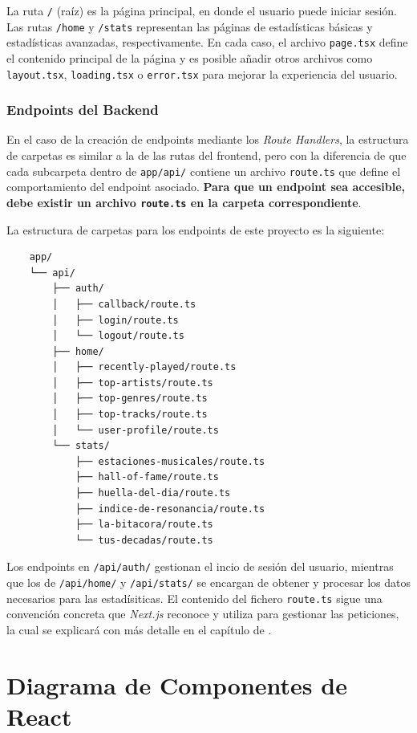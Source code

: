La ruta \texttt{/} (raíz) es la página principal, en donde el usuario puede iniciar sesión. Las rutas \texttt{/home} y \texttt{/stats} representan las páginas de estadísticas básicas y estadísticas avanzadas, respectivamente. En cada caso, el archivo \texttt{page.tsx} define el contenido principal de la página y es posible añadir otros archivos como \texttt{layout.tsx}, \texttt{loading.tsx} o \texttt{error.tsx} para mejorar la experiencia del usuario.

\subsubsection{Endpoints del Backend}

En el caso de la creación de endpoints mediante los \textit{Route Handlers}, la estructura de carpetas es similar a la de las rutas del frontend, pero con la diferencia de que cada subcarpeta dentro de \texttt{app/api/} contiene un archivo \texttt{route.ts} que define el comportamiento del endpoint asociado. \textbf{Para que un endpoint sea accesible, debe existir un archivo \texttt{route.ts} en la carpeta correspondiente}.

La estructura de carpetas para los endpoints de este proyecto es la siguiente:

\begin{verbatim}
    app/
    └── api/
        ├── auth/
        │   ├── callback/route.ts
        │   ├── login/route.ts
        │   └── logout/route.ts
        ├── home/
        │   ├── recently-played/route.ts
        │   ├── top-artists/route.ts
        │   ├── top-genres/route.ts
        │   ├── top-tracks/route.ts
        │   └── user-profile/route.ts
        └── stats/
            ├── estaciones-musicales/route.ts
            ├── hall-of-fame/route.ts
            ├── huella-del-dia/route.ts
            ├── indice-de-resonancia/route.ts
            ├── la-bitacora/route.ts
            └── tus-decadas/route.ts
\end{verbatim}

Los endpoints en \texttt{/api/auth/} gestionan el incio de sesión del usuario, mientras que los de \texttt{/api/home/} y \texttt{/api/stats/} se encargan de obtener y procesar los datos necesarios para las estadísiticas. El contenido del fichero \texttt{route.ts} sigue una convención concreta que \textit{Next.js} reconoce y utiliza para gestionar las peticiones, la cual se explicará con más detalle en el capítulo de .

\section{Diagrama de Componentes de React}

